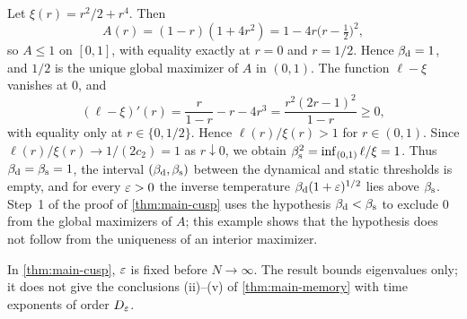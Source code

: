 \begin{example}\label{ex:inf-degenerate}
Let $\xi(r)=r^2/2+r^4$. Then
\begin{equation*}
A(r)=(1-r)(1+4r^2)=1-4r\bigl(r-\tfrac12\bigr)^2,
\end{equation*}
so $A\le1$ on $[0,1]$, with equality exactly at $r=0$ and $r=1/2$. Hence $\beta_{\mathrm d}=1$, and $1/2$ is the unique global maximizer of $A$ in $(0,1)$. The function $\ell-\xi$ vanishes at $0$, and
\begin{equation*}
(\ell-\xi)'(r)=\frac r{1-r}-r-4r^3=\frac{r^2(2r-1)^2}{1-r}\ge0,
\end{equation*}
with equality only at $r\in\{0,1/2\}$. Hence $\ell(r)/\xi(r)>1$ for $r\in(0,1)$. Since $\ell(r)/\xi(r)\to1/(2c_2)=1$ as $r\downarrow0$, we obtain $\beta_{\mathrm s}^2=\inf_{(0,1)}\ell/\xi=1$. Thus $\beta_{\mathrm d}=\beta_{\mathrm s}=1$, the interval $(\beta_{\mathrm d},\beta_{\mathrm s})$ between the dynamical and static thresholds is empty, and for every $\varepsilon>0$ the inverse temperature $\beta_{\mathrm d}(1+\varepsilon)^{1/2}$ lies above $\beta_{\mathrm s}$. Step~1 of the proof of \cref{thm:main-cusp} uses the hypothesis $\beta_{\mathrm d}<\beta_{\mathrm s}$ to exclude $0$ from the global maximizers of $A$; this example shows that the hypothesis does not follow from the uniqueness of an interior maximizer.
\end{example}

In \cref{thm:main-cusp}, $\varepsilon$ is fixed before $N\to\infty$. The result bounds eigenvalues only; it does not give the conclusions (ii)--(v) of \cref{thm:main-memory} with time exponents of order $D_\varepsilon$.
